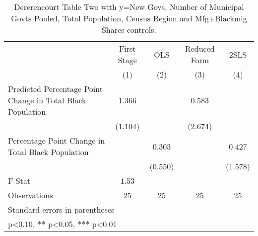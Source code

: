 \begin{table}[htbp]\centering
\def\sym#1{\ifmmode^{#1}\else\(^{#1}\)\fi}
\caption{Dererencourt Table Two with y=New Govs, Number of Municipal Govts  Pooled, Total Population, Census Region and Mfg+Blackmig Shares controls.}
\begin{tabular}{l*{4}{c}}
\toprule
                    & First Stage   &         OLS   &Reduced Form   &        2SLS   \\
                    &\multicolumn{1}{c}{(1)}   &\multicolumn{1}{c}{(2)}   &\multicolumn{1}{c}{(3)}   &\multicolumn{1}{c}{(4)}   \\
\midrule
Predicted Percentage Point Change in Total Black Population&       1.366   &               &       0.583   &               \\
                    &     (1.104)   &               &     (2.674)   &               \\
\addlinespace
Percentage Point Change in Total Black Population&               &       0.303   &               &       0.427   \\
                    &               &     (0.550)   &               &     (1.578)   \\
\midrule
F-Stat              &        1.53   &               &               &               \\
Observations        &          25   &          25   &          25   &          25   \\
\bottomrule
\multicolumn{5}{l}{\footnotesize Standard errors in parentheses}\\
\multicolumn{5}{l}{\footnotesize * p<0.10, ** p<0.05, *** p<0.01}\\
\end{tabular}
\end{table}
